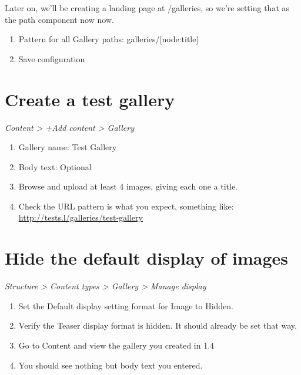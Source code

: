 \documentclass[letterpaper,10pt,english]{sphinxmanual}
\begin{document}
Later on, we’ll be creating a landing page at /galleries, so we’re setting that as the path component now now.
\begin{enumerate}
\item {} 
Pattern for all Gallery paths: galleries/{[}node:title{]}

\item {} 
Save configuration

\end{enumerate}


\section{Create a test gallery}
\label{slideshows:create-a-test-gallery}
\emph{Content \textgreater{} +Add content \textgreater{} Gallery}
\begin{enumerate}
\item {} 
Gallery name: Test Gallery

\item {} 
Body text: Optional

\item {} 
Browse and upload at least 4 images, giving each one a title.

\item {} 
Check the URL pattern is what you expect, something like: \href{http://tests.l/galleries/test-gallery}{http://tests.l/galleries/test-gallery}

\end{enumerate}


\section{Hide the default display of images}
\label{slideshows:hide-the-default-display-of-images}
\emph{Structure \textgreater{} Content types \textgreater{} Gallery \textgreater{} Manage display}
\begin{enumerate}
\item {} 
Set the Default display setting format for Image to Hidden.

\item {} 
Verify the Teaser display format is hidden. It should already be set that way.

\item {} 
Go to Content and view the gallery you created in 1.4

\item {} 
You should see nothing but body text you entered.

\end{enumerate}
\end{document}
